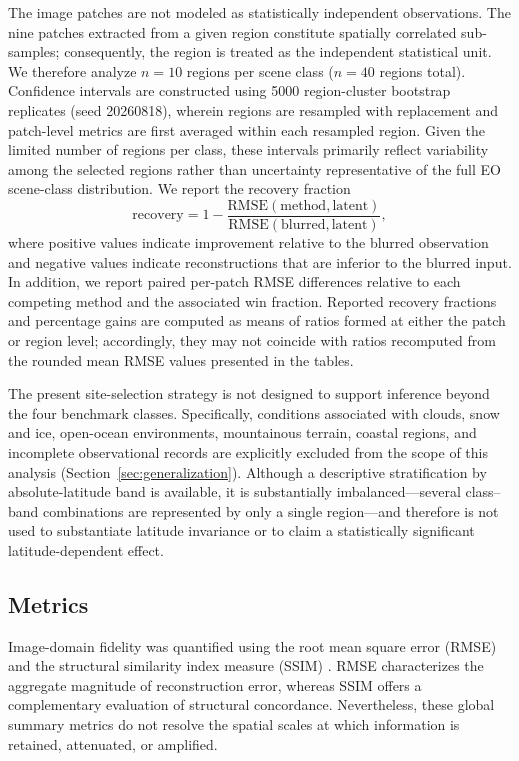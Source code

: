 \documentclass[journal]{IEEEtran}
\begin{document}
The image patches are not modeled as statistically independent observations. The nine patches extracted from a given region constitute spatially correlated sub-samples; consequently, the region is treated as the independent statistical unit. We therefore analyze $n=10$ regions per scene class ($n=40$ regions total). Confidence intervals are constructed using 5000 region-cluster bootstrap replicates (seed 20260818), wherein regions are resampled with replacement and patch-level metrics are first averaged within each resampled region. Given the limited number of regions per class, these intervals primarily reflect variability among the selected regions rather than uncertainty representative of the full EO scene-class distribution. We report the recovery fraction
\begin{equation}
\text{recovery}
=
1-\frac{\mathrm{RMSE}(\text{method},\text{latent})}{\mathrm{RMSE}(\text{blurred},\text{latent})},
\label{eq:recovery_fraction}
\end{equation}
where positive values indicate improvement relative to the blurred observation and negative values indicate reconstructions that are inferior to the blurred input. In addition, we report paired per-patch RMSE differences relative to each competing method and the associated win fraction. Reported recovery fractions and percentage gains are computed as means of ratios formed at either the patch or region level; accordingly, they may not coincide with ratios recomputed from the rounded mean RMSE values presented in the tables.

The present site-selection strategy is not designed to support inference beyond the four benchmark classes. Specifically, conditions associated with clouds, snow and ice, open-ocean environments, mountainous terrain, coastal regions, and incomplete observational records are explicitly excluded from the scope of this analysis (Section~\ref{sec:generalization}). Although a descriptive stratification by absolute-latitude band is available, it is substantially imbalanced—several class–band combinations are represented by only a single region—and therefore is not used to substantiate latitude invariance or to claim a statistically significant latitude-dependent effect.

\subsection{Metrics}

Image-domain fidelity was quantified using the root mean square error (RMSE) and the structural similarity index measure (SSIM) \cite{wang2004ssim}. RMSE characterizes the aggregate magnitude of reconstruction error, whereas SSIM offers a complementary evaluation of structural concordance. Nevertheless, these global summary metrics do not resolve the spatial scales at which information is retained, attenuated, or amplified.
\end{document}
